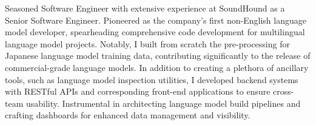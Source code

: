 

\begin{cvparagraph}

Seasoned Software Engineer with extensive experience at SoundHound as a Senior Software Engineer. Pioneered as the company's first non-English language model developer, spearheading comprehensive code development for multilingual language model projects. Notably, I built from scratch the pre-processing for Japanese language model training data, contributing significantly to the release of commercial-grade language models. In addition to creating a plethora of ancillary tools, such as language model inspection utilities, I developed backend systems with RESTful APIs and corresponding front-end applications to ensure cross-team usability. Instrumental in architecting language model build pipelines and crafting dashboards for enhanced data management and visibility.
\end{cvparagraph}
